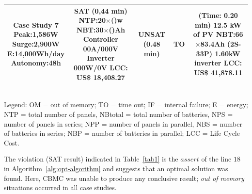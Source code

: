 \documentclass[10pt,journal,compsoc]{IEEEtran}
\begin{document}
\begin{table}
\begin{scriptsize}
\begin{tabular}{c|c|c|c|c}
\hline
\makecell{\textbf{Case Study 7}\\Peak:1,586W\\Surge:2,900W\\E:14,000Wh/day\\Autonomy:48h} & \makecell{SAT (0,44 min) \\NTP:20$\times$()w\\NBT:30$\times$()Ah\\Controller 00A/000V\\Inverter 000W/0V\\LCC: US\$ 18,408.27}  &
UNSAT (0.48 min) & TO & \makecell{(Time: 0.20 min)\\12.5 kW of PV\\NBT:66$\times$83.4Ah (2S-33P)\\1.60kW inverter\\LCC: US\$ 41,878.11} \\
\hline
\hline
\end{tabular}
\\Legend: OM = out of memory; TO = time out; IF = internal failure; E = energy; NTP = total number of panels, NBtotal = total number of batteries, NPS = number of panels in series; NPP = number of panels in parallel, NBS = number of batteries in series; NBP = number of batteries in parallel; LCC = Life Cycle Cost.
\end{scriptsize}
\end{table}
%
The violation (SAT result) indicated in Table~\ref{tab1} is the $assert$ of the line $18$ in Algorithm~\ref{alg:opt-algorithm} and suggests that an optimal solution was found.
Here, CBMC was unable to produce any conclusive result; \textit{out of memory} situations occurred in all case studies.
\end{document}

